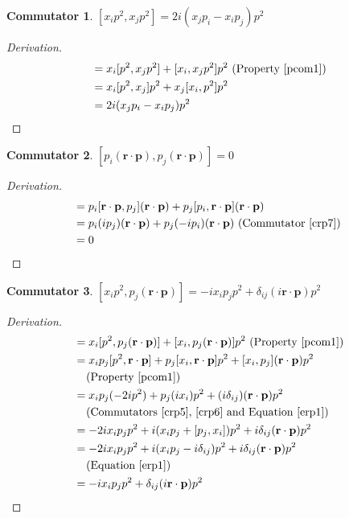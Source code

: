\documentclass[12pt,a4paper]{report}
\theoremstyle{definition}
\newtheorem{commutator}{Commutator}[section]
\newenvironment{derivation}
  {\renewcommand\qedsymbol{$\square$}\begin{proof}[Derivation]}
  {\end{proof}}
\theoremstyle{remark}
\theoremstyle{remark}
\begin{document}
\begin{appendices}
\begin{commutator}\label{crp9}
$[x_ip^2,x_jp^2]=2i(x_jp_i-x_ip_j)p^2$
\end{commutator}
\begin{derivation}
\begin{align*}
[x_ip^2,x_jp^2] &= x_i[p^2,x_jp^2]+[x_i,x_jp^2]p^2 \text{ (Property~\ref{pcom1})} \\
&= x_i[p^2,x_j]p^2+x_j[x_i,p^2]p^2 \\
&= 2i(x_jp_i-x_ip_j)p^2
\end{align*}
\end{derivation}

\begin{commutator}\label{crp10}
$[p_i(\textbf{r}\cdot\textbf{p}),p_j(\textbf{r}\cdot\textbf{p})]=0$
\end{commutator}
\begin{derivation}
\begin{align*}
[p_i(\textbf{r}\cdot\textbf{p}),p_j(\textbf{r}\cdot\textbf{p})] &= p_i[\textbf{r}\cdot\textbf{p},p_j](\textbf{r}\cdot\textbf{p})+p_j[p_i,\textbf{r}\cdot\textbf{p}](\textbf{r}\cdot\textbf{p}) \\
&= p_i(i p_j)(\textbf{r}\cdot\textbf{p})+p_j(-i p_i)(\textbf{r}\cdot\textbf{p}) \text{ (Commutator~\ref{crp7}) }\\
&=0
\end{align*}
\end{derivation}

\begin{commutator}\label{crp11}
$[x_ip^2,p_j(\textbf{r}\cdot\textbf{p})]=-i x_ip_jp^2+\delta_{ij}(i\textbf{r}\cdot\textbf{p})p^2$
\end{commutator}
\begin{derivation}
\begin{align*}
[x_ip^2,p_j(\textbf{r}\cdot\textbf{p})] &= x_i[p^2,p_j(\textbf{r}\cdot\textbf{p})]+[x_i,p_j(\textbf{r}\cdot\textbf{p})]p^2 \text{ (Property~\ref{pcom1})} \\
&= x_ip_j[p^2,\textbf{r}\cdot\textbf{p}]+p_j[x_i,\textbf{r}\cdot\textbf{p}]p^2+[x_i,p_j](\textbf{r}\cdot\textbf{p})p^2 \\
&\phantom{=}\text{ (Property~\ref{pcom1})} \\
&= x_ip_j(-2i p^2)+p_j(i x_i)p^2+(i\delta_{ij})(\textbf{r}\cdot\textbf{p})p^2 \\
&\phantom{=}\text{ (Commutators~\ref{crp5},~\ref{crp6} and Equation~\ref{erp1})} \\
&= -2i x_ip_jp^2+i(x_ip_j+[p_j,x_i])p^2+i\delta_{ij}(\textbf{r}\cdot\textbf{p})p^2 \\
&= -2i x_ip_jp^2+i(x_ip_j-i\delta_{ij})p^2+i\delta_{ij}(\textbf{r}\cdot\textbf{p})p^2 \\
&\phantom{=}\text{ (Equation~\ref{erp1})} \\
&= -i x_ip_jp^2+\delta_{ij}(i\textbf{r}\cdot\textbf{p})p^2
\end{align*}
\end{derivation}


\end{appendices}
\end{document}
